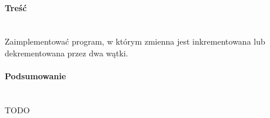 \paragraph{Treść}~\\
Zaimplementować program, w którym zmienna jest inkrementowana lub dekrementowana przez dwa wątki.





\paragraph{Podsumowanie}~\\
TODO
